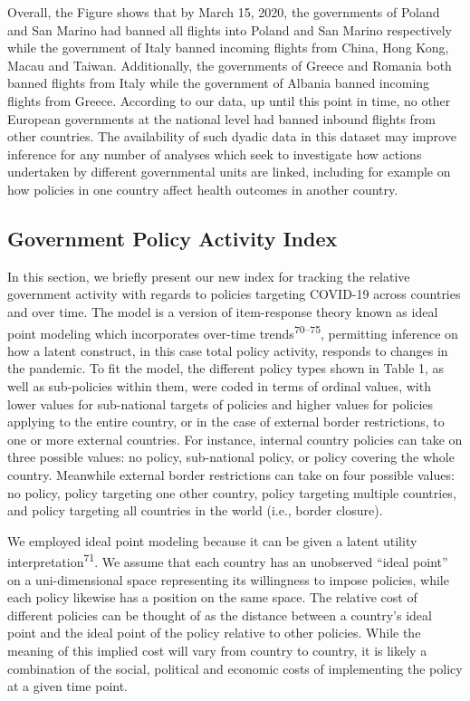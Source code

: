 \documentclass[]{article}
\begin{document}
Overall, the Figure shows that by March 15, 2020, the governments of Poland and San Marino had banned all flights into Poland and San Marino respectively while the government of Italy banned incoming flights from China, Hong Kong, Macau and Taiwan. Additionally, the governments of Greece and Romania both banned flights from Italy while the government of Albania banned incoming flights from Greece. According to our data, up until this point in time, no other European governments at the national level had banned inbound flights from other countries. The availability of such dyadic data in this dataset may improve inference for any number of analyses which seek to investigate how actions undertaken by different governmental units are linked, including for example on how policies in one country affect health outcomes in another country.

\hypertarget{government-policy-activity-index}{%
\subsection*{Government Policy Activity Index}\label{government-policy-activity-index}}

In this section, we briefly present our new index for tracking the relative government activity with regards to policies targeting COVID-19 across countries and over time. The model is a version of item-response theory known as ideal point modeling which incorporates over-time trends\textsuperscript{70--75}, permitting inference on how a latent construct, in this case total policy activity, responds to changes in the pandemic. To fit the model, the different policy types shown in Table 1, as well as sub-policies within them, were coded in terms of ordinal values, with lower values for sub-national targets of policies and higher values for policies applying to the entire country, or in the case of external border restrictions, to one or more external countries. For instance, internal country policies can take on three possible values: no policy, sub-national policy, or policy covering the whole country. Meanwhile external border restrictions can take on four possible values: no policy, policy targeting one other country, policy targeting multiple countries, and policy targeting all countries in the world (i.e., border closure).

We employed ideal point modeling because it can be given a latent utility interpretation\textsuperscript{71}. We assume that each country has an unobserved ``ideal point'' on a uni-dimensional space representing its willingness to impose policies, while each policy likewise has a position on the same space. The relative cost of different policies can be thought of as the distance between a country's ideal point and the ideal point of the policy relative to other policies. While the meaning of this implied cost will vary from country to country, it is likely a combination of the social, political and economic costs of implementing the policy at a given time point.
\end{document}
